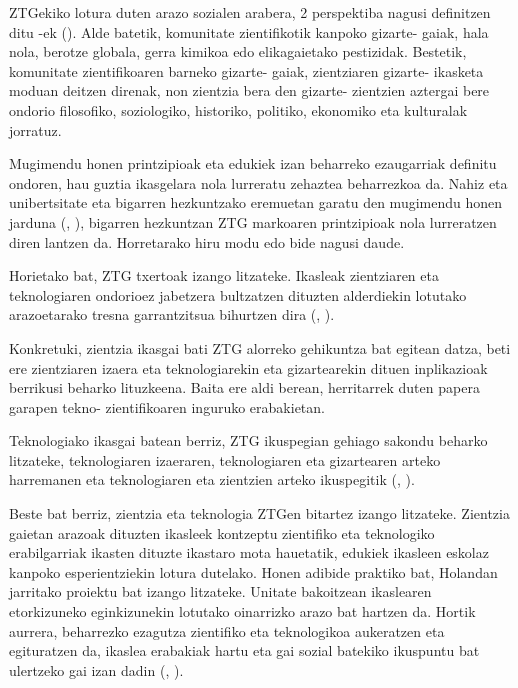 ZTGekiko lotura duten arazo sozialen arabera, 2 perspektiba nagusi definitzen ditu \citeauthor{rosenthal1989two}-ek (\citeyear{rosenthal1989two}). Alde batetik, komunitate zientifikotik kanpoko gizarte- gaiak, hala nola, berotze globala, gerra kimikoa edo elikagaietako pestizidak. Bestetik, komunitate zientifikoaren barneko gizarte- gaiak, zientziaren gizarte- ikasketa moduan deitzen direnak, non zientzia bera den gizarte- zientzien aztergai bere ondorio filosofiko, soziologiko, historiko, politiko, ekonomiko eta kulturalak jorratuz.

Mugimendu honen printzipioak eta edukiek izan beharreko ezaugarriak definitu ondoren, hau guztia ikasgelara nola lurreratu zehaztea beharrezkoa da. Nahiz eta unibertsitate eta bigarren hezkuntzako eremuetan garatu den mugimendu honen jarduna (\citeauthor{membiela1997revision}, \citeyear{membiela1997revision}), bigarren hezkuntzan ZTG markoaren printzipioak nola lurreratzen diren lantzen da. Horretarako hiru modu edo bide nagusi daude.

Horietako bat, ZTG txertoak izango litzateke. Ikasleak zientziaren eta teknologiaren ondorioez jabetzera bultzatzen dituzten alderdiekin lotutako arazoetarako tresna garrantzitsua bihurtzen dira (\citeauthor{osorio2002educacion}, \citeyear{osorio2002educacion}). 

Konkretuki, zientzia ikasgai bati ZTG alorreko gehikuntza bat egitean datza, beti ere zientziaren izaera eta teknologiarekin eta gizartearekin dituen inplikazioak berrikusi beharko lituzkeena. Baita ere aldi berean, herritarrek duten papera garapen tekno- zientifikoaren inguruko erabakietan.

Teknologiako ikasgai batean berriz, ZTG ikuspegian gehiago sakondu beharko litzateke, teknologiaren izaeraren, teknologiaren eta gizartearen arteko harremanen eta teknologiaren eta zientzien arteko ikuspegitik (\citeauthor{osorio2002educacion}, \citeyear{osorio2002educacion}).

Beste bat berriz, zientzia eta teknologia ZTGen bitartez izango litzateke. Zientzia gaietan arazoak dituzten ikasleek kontzeptu zientifiko eta teknologiko erabilgarriak ikasten dituzte ikastaro mota hauetatik, edukiek ikasleen eskolaz kanpoko esperientziekin lotura dutelako. Honen adibide praktiko bat, Holandan jarritako proiektu bat izango litzateke. Unitate bakoitzean ikaslearen etorkizuneko eginkizunekin lotutako oinarrizko arazo bat hartzen da. Hortik aurrera, beharrezko ezagutza zientifiko eta teknologikoa aukeratzen eta egituratzen da, ikaslea erabakiak hartu eta gai sozial batekiko ikuspuntu bat ulertzeko gai izan dadin (\citeauthor{gonzalez1996ciencia}, \citeyear{gonzalez1996ciencia}).

